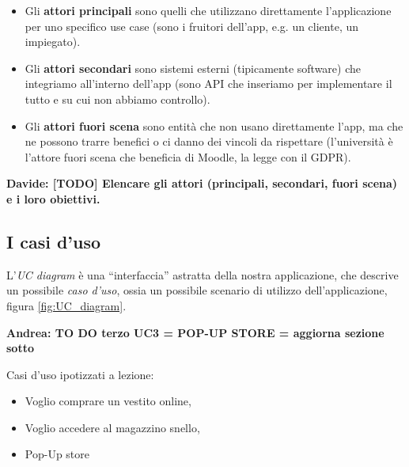 \documentclass[12pt]{article}
\newcommand{\andrea}[1]{{\bf \color{mauve} Andrea: #1 }}
\newcommand{\davide}[1]{{\bf \color{chromeyellow} Davide: #1 }}
\begin{document}
\begin{itemize}
    \item Gli \textbf{attori principali} sono quelli che utilizzano direttamente l’applicazione per uno specifico use case (sono i fruitori dell’app, e.g. un cliente, un impiegato).
    \item Gli \textbf{attori secondari} sono sistemi esterni (tipicamente software) che integriamo all’interno dell’app (sono API che inseriamo per implementare il tutto e su cui non abbiamo controllo).
    \item Gli \textbf{attori fuori scena} sono entità che non usano direttamente l’app, ma che ne possono trarre benefici o ci danno dei vincoli da rispettare (l’università è l’attore fuori scena che beneficia di Moodle, la legge con il GDPR).
\end{itemize}


\davide{\textbf{[TODO]} Elencare gli attori (principali, secondari, fuori scena) e i loro obiettivi.}

\subsection{I casi d'uso}
\label{subsec:UC}

L'{\em UC diagram} è una “interfaccia” astratta della nostra applicazione, che descrive un possibile {\em caso d'uso}, ossia un possibile scenario di utilizzo dell'applicazione, figura \ref{fig:UC_diagram}.


\andrea{\textbf{TO DO} terzo UC3 = POP-UP STORE = aggiorna sezione sotto}


Casi d'uso ipotizzati a lezione:
\begin{itemize}
    \item Voglio comprare un vestito online,
    \item Voglio accedere al magazzino snello,
    \item Pop-Up store  
\end{itemize}
\end{document}
